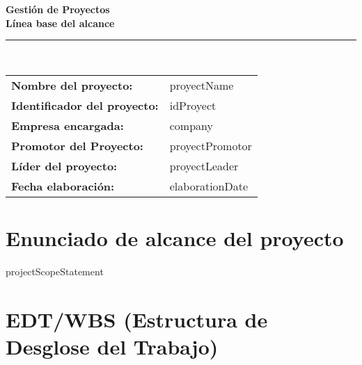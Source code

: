 \documentclass[11pt]{article}
\begin{document}
    \begin{center}
        \color{titlecolor}
        {\Huge\textbf{Gestión de Proyectos}}\\[1cm]
        {\large\textbf{Línea base del alcance}}\\[0.5cm]
        \rule{\textwidth}{1pt}\\[1.5cm]

        \begin{tabular}{>{\bfseries}ll}
            \textcolor{sectioncolor}{Nombre del proyecto:} & {{proyectName}} \\[0.4cm]
            \textcolor{sectioncolor}{Identificador del proyecto:} & {{idProyect}} \\[0.4cm]
            \textcolor{sectioncolor}{Empresa encargada:} & {{company}} \\[0.4cm]
            \textcolor{sectioncolor}{Promotor del Proyecto:} & {{proyectPromotor}} \\[0.4cm]
            \textcolor{sectioncolor}{Líder del proyecto:} & {{proyectLeader}} \\[0.4cm]
            \textcolor{sectioncolor}{Fecha elaboración:} & {{elaborationDate}} \\
        \end{tabular}
    \end{center}
    \thispagestyle{empty}
    \newpage

    \tableofcontents
    \thispagestyle{empty}
    \newpage

    \section{Enunciado de alcance del proyecto}
    \large
    {{projectScopeStatement}}
    \normalsize

    \section{EDT/WBS (Estructura de Desglose del Trabajo)}
    \begin{center}
    \end{center}
\end{document}
